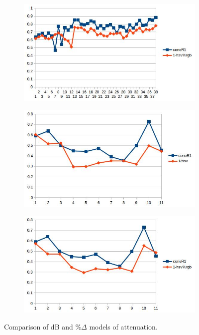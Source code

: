 \documentclass[12pt]{report}
\begin{document}
\begin{figure}
\begin{subfigure}{.49\linewidth}
  \caption{}
\end{subfigure}
\begin{subfigure}{.49\linewidth}
  \includegraphics[width=1\linewidth]{figures/correlations/rgb/campus_hsv.jpg}
  \caption{}
\end{subfigure}
\hfill
\begin{subfigure}{.49\linewidth}
  \includegraphics[width=1\linewidth]{figures/correlations/db/pets2_hsv.jpg}
  \caption{}
\end{subfigure}
\begin{subfigure}{.49\linewidth}
  \includegraphics[width=1\linewidth]{figures/correlations/rgb/pets2_hsv.jpg}
  \caption{}
\end{subfigure}

\caption{Comparison of dB and \%$\Delta$ models of attenuation. }
\label{fig:corr_compare}
\end{figure}
\end{document}

